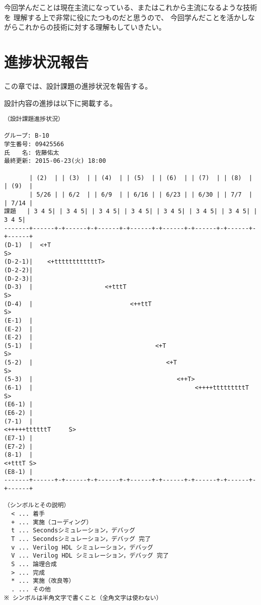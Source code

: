 \documentclass{jarticle}[11pt]
\begin{document}
今回学んだことは現在主流になっている、またはこれから主流になるような技術を
理解する上で非常に役にたつものだと思うので、
今回学んだことを活かしながらこれからの技術に対する理解もしていきたい。



\section{進捗状況報告}
\label{sec:進捗状況報告}

この章では、設計課題の進捗状況を報告する。

設計内容の進捗は以下に掲載する。

\begin{verbatim}
（設計課題進捗状況）

グループ: B-10
学生番号: 09425566
氏　　名: 佐藤佑太
最終更新: 2015-06-23(火) 18:00

       | (2)  | | (3)  | | (4)  | | (5)  | | (6)  | | (7)  | | (8)  | | (9)  | 
       | 5/26 | | 6/2  | | 6/9  | | 6/16 | | 6/23 | | 6/30 | | 7/7  | | 7/14 |
課題   | 3 4 5| | 3 4 5| | 3 4 5| | 3 4 5| | 3 4 5| | 3 4 5| | 3 4 5| | 3 4 5|
-------+------+-+------+-+------+-+------+-+------+-+------+-+------+-+------+
(D-1)  |  <+T                                                               S>
(D-2-1)|    <+ttttttttttttT>                                             
(D-2-2)|  
(D-2-3)|  
(D-3)  |                    <+tttT                                          S> 
(D-4)  |                           <++ttT                                   S>
(E-1)  |
(E-2)  |
(E-2)  |
(5-1)  |                                  <+T                                S>
(5-2)  |                                     <+T                             S>
(5-3)  |                                        <++T>                    
(6-1)  |                                             <++++tttttttttT         S>
(E6-1) |
(E6-2) |
(7-1)  |                                                   <+++++ttttttT     S>
(E7-1) |
(E7-2) |
(8-1)  |                                                              <+tttT S>
(E8-1) |
-------+------+-+------+-+------+-+------+-+------+-+------+-+------+-+------+

（シンボルとその説明）
  < ... 着手
  + ... 実施（コーディング）
  t ... Secondsシミュレーション，デバッグ
  T ... Secondsシミュレーション，デバッグ 完了
  v ... Verilog HDL シミュレーション，デバッグ
  V ... Verilog HDL シミュレーション，デバッグ 完了
  S ... 論理合成  
  > ... 完成
  * ... 実施（改良等）
  . ... その他
※ シンボルは半角文字で書くこと（全角文字は使わない）


\end{verbatim}
\end{document}

